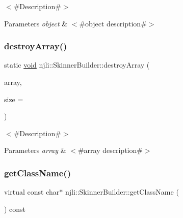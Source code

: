$<$\#\+Description\#$>$


\begin{DoxyParams}{Parameters}
{\em object} & $<$\#object description\#$>$ \\
\hline
\end{DoxyParams}
\mbox{\label{classnjli_1_1_skinner_builder_ad3dff1600ab1e01de4e4932fde4d58e2}} 
\subsubsection{\texorpdfstring{destroy\+Array()}{destroyArray()}}
{\footnotesize\ttfamily static \mbox{\hyperlink{_thread_8h_af1e856da2e658414cb2456cb6f7ebc66}{void}} njli\+::\+Skinner\+Builder\+::destroy\+Array (\begin{DoxyParamCaption}\item[{\mbox{\hyperlink{classnjli_1_1_skinner_builder}{Skinner\+Builder}} $\ast$$\ast$}]{array,  }\item[{const \mbox{\hyperlink{_util_8h_a10e94b422ef0c20dcdec20d31a1f5049}{u32}}}]{size = {} }\end{DoxyParamCaption})\hspace{0.3cm}{\ttfamily [static]}}

$<$\#\+Description\#$>$


\begin{DoxyParams}{Parameters}
{\em array} & $<$\#array description\#$>$ \\
\hline
\end{DoxyParams}
\mbox{\label{classnjli_1_1_skinner_builder_a9c1161b91b23a079a4a060a7ff679e1b}} 
\subsubsection{\texorpdfstring{get\+Class\+Name()}{getClassName()}}
{\footnotesize\ttfamily virtual const char$\ast$ njli\+::\+Skinner\+Builder\+::get\+Class\+Name (\begin{DoxyParamCaption}{ }\end{DoxyParamCaption}) const\hspace{0.3cm}{\ttfamily [virtual]}}

